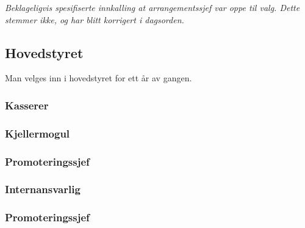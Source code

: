 \documentclass[10pt,norsk,a4paper]{article}
\begin{document}
\textit{
    Beklageligvis spesifiserte innkalling at arrangementssjef var oppe til valg.
    Dette stemmer ikke, og har blitt korrigert i dagsorden.
}

\begin{minipage}[t]{0.49\textwidth}
\subsection{Hovedstyret} %
Man velges inn i hovedstyret for ett år av gangen.

\subsubsection{Kasserer}
\subsubsection{Kjellermogul}
\subsubsection{Promoteringssjef}
\subsubsection{Internansvarlig}
\subsubsection{Promoteringssjef}

\end{minipage}
\end{document}
